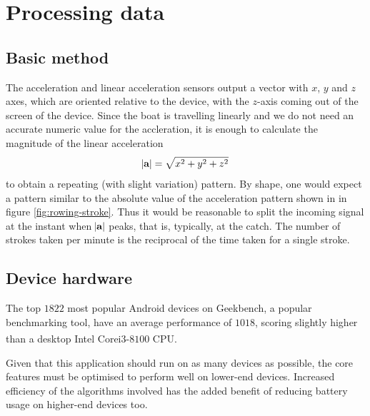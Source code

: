 \documentclass[11pt,twoside,a4paper]{report}
\begin{document}
\section{Processing data}

\subsection{Basic method}

The acceleration and linear acceleration sensors output a vector with $x$, $y$ and $z$ axes, which are oriented relative to the device, with the $z$-axis coming out of the screen of the device. 
Since the boat is travelling linearly and we do not need an accurate numeric value for the accleration, it is enough to calculate the magnitude of the linear acceleration
\[
  \abs{\textbf{a}} = \sqrt{x^2 + y^2 + z^2} 
\] 
to obtain a repeating (with slight variation) pattern. By shape, one would expect a pattern similar to the absolute value of the acceleration pattern shown in in figure \ref{fig:rowing-stroke}.
Thus it would be reasonable to split the incoming signal at the instant when $\abs{\textbf{a}}$ peaks, that is, typically, at the catch. 
The number of strokes taken per minute is the reciprocal of the time taken for a single stroke.

\subsection{Device hardware}

The top $1822$ most popular Android devices on Geekbench, a popular benchmarking tool, have an average performance of $1018$, scoring slightly higher than a desktop Intel\textsuperscript{\textregistered} Core\texttrademark i$3$-$8100$ CPU. \cite{android_benchmarks} 

Given that this application should run on as many devices as possible, the core features must be optimised to perform well on lower-end devices.
Increased efficiency of the algorithms involved has the added benefit of reducing battery usage on higher-end devices too.

\medskip

\printbibliography[heading=bibintoc]
\end{document}
